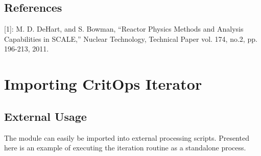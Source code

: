 \documentclass[letterpaper,10pt,english]{sphinxmanual}
\begin{document}
\section{References}
\label{\detokenize{intro:references}}
{[}1{]}: M. D. DeHart, and S. Bowman, ``Reactor Physics Methods and Analysis Capabilities in SCALE,'' Nuclear Technology, Technical Paper vol. 174, no.2, pp. 196-213, 2011.


\chapter{Importing CritOps Iterator}
\label{\detokenize{external_iteration::doc}}\label{\detokenize{external_iteration:importing-critops-iterator}}

\section{External Usage}
\label{\detokenize{external_iteration:external-usage}}\label{\detokenize{external_iteration:external}}
The  module can easily be imported into external processing scripts.
Presented here is an example of executing the iteration routine as a standalone process.
\end{document}
